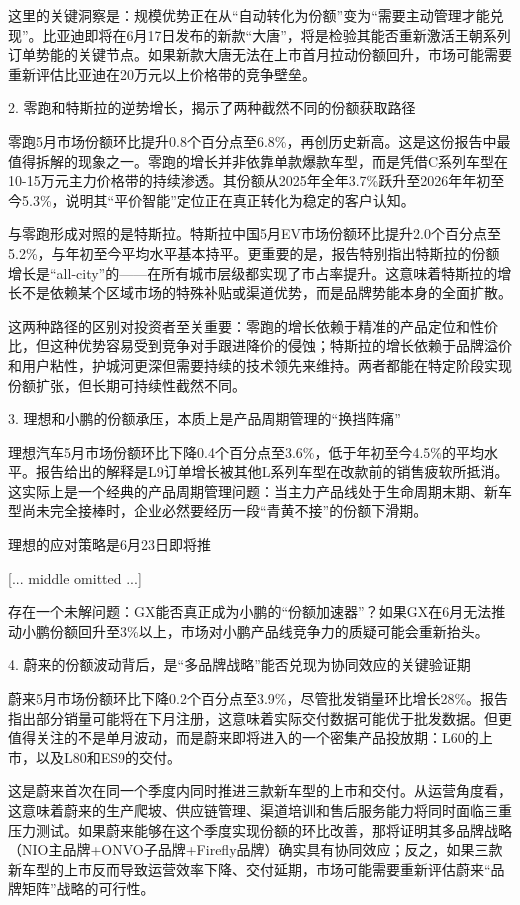 \documentclass[11pt]{ctexart}
\begin{document}
这里的关键洞察是：规模优势正在从“自动转化为份额”变为“需要主动管理才能兑现”。比亚迪即将在6月17日发布的新款“大唐”，将是检验其能否重新激活王朝系列订单势能的关键节点。如果新款大唐无法在上市首月拉动份额回升，市场可能需要重新评估比亚迪在20万元以上价格带的竞争壁垒。

2. 零跑和特斯拉的逆势增长，揭示了两种截然不同的份额获取路径

零跑5月市场份额环比提升0.8个百分点至6.8\%，再创历史新高。这是这份报告中最值得拆解的现象之一。零跑的增长并非依靠单款爆款车型，而是凭借C系列车型在10-15万元主力价格带的持续渗透。其份额从2025年全年3.7\%跃升至2026年年初至今5.3\%，说明其“平价智能”定位正在真正转化为稳定的客户认知。

与零跑形成对照的是特斯拉。特斯拉中国5月EV市场份额环比提升2.0个百分点至5.2\%，与年初至今平均水平基本持平。更重要的是，报告特别指出特斯拉的份额增长是“all-city”的——在所有城市层级都实现了市占率提升。这意味着特斯拉的增长不是依赖某个区域市场的特殊补贴或渠道优势，而是品牌势能本身的全面扩散。

这两种路径的区别对投资者至关重要：零跑的增长依赖于精准的产品定位和性价比，但这种优势容易受到竞争对手跟进降价的侵蚀；特斯拉的增长依赖于品牌溢价和用户粘性，护城河更深但需要持续的技术领先来维持。两者都能在特定阶段实现份额扩张，但长期可持续性截然不同。

3. 理想和小鹏的份额承压，本质上是产品周期管理的“换挡阵痛”

理想汽车5月市场份额环比下降0.4个百分点至3.6\%，低于年初至今4.5\%的平均水平。报告给出的解释是L9订单增长被其他L系列车型在改款前的销售疲软所抵消。这实际上是一个经典的产品周期管理问题：当主力产品线处于生命周期末期、新车型尚未完全接棒时，企业必然要经历一段“青黄不接”的份额下滑期。

理想的应对策略是6月23日即将推

[... middle omitted ...]

存在一个未解问题：GX能否真正成为小鹏的“份额加速器”？如果GX在6月无法推动小鹏份额回升至3\%以上，市场对小鹏产品线竞争力的质疑可能会重新抬头。

4. 蔚来的份额波动背后，是“多品牌战略”能否兑现为协同效应的关键验证期

蔚来5月市场份额环比下降0.2个百分点至3.9\%，尽管批发销量环比增长28\%。报告指出部分销量可能将在下月注册，这意味着实际交付数据可能优于批发数据。但更值得关注的不是单月波动，而是蔚来即将进入的一个密集产品投放期：L60的上市，以及L80和ES9的交付。

这是蔚来首次在同一个季度内同时推进三款新车型的上市和交付。从运营角度看，这意味着蔚来的生产爬坡、供应链管理、渠道培训和售后服务能力将同时面临三重压力测试。如果蔚来能够在这个季度实现份额的环比改善，那将证明其多品牌战略（NIO主品牌+ONVO子品牌+Firefly品牌）确实具有协同效应；反之，如果三款新车型的上市反而导致运营效率下降、交付延期，市场可能需要重新评估蔚来“品牌矩阵”战略的可行性。
\end{document}

